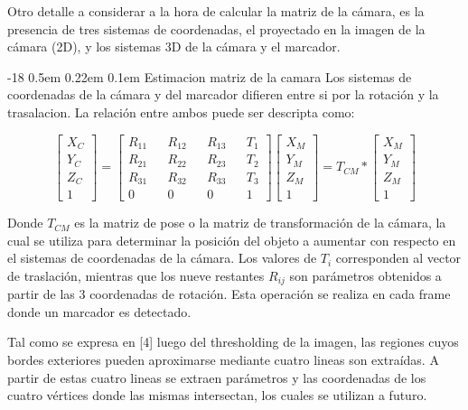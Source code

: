 \documentclass[runningheads]{llncs}
\makeatletter
\renewcommand\subsubsection{\@startsection{subsubsection}{3}{\z@}%
	{-18\p@ \@plus -4\p@ \@minus -4\p@}%
	{0.5em \@plus 0.22em \@minus 0.1em}%
	{\normalfont\normalsize\bfseries\boldmath}}
\makeatother
\begin{document}
Otro detalle a considerar a la hora de calcular la matriz de la cámara, es la presencia de tres sistemas de coordenadas, el proyectado en la imagen de la cámara (2D), y los sistemas 3D de la cámara y el marcador.
	
\subsubsection{Estimacion matriz de la camara}
Los sistemas de coordenadas de la cámara y del marcador difieren entre si por la rotación y la trasalacion. La relación entre ambos puede ser descripta como:

\[
\begin{bmatrix}
X_{C} \\
Y_{C} \\
Z_{C} \\
1
\end{bmatrix} =
\begin{bmatrix}
R_{11} && R_{12} && R_{13} && T_{1} \\
R_{21} && R_{22} && R_{23} && T_{2} \\
R_{31} && R_{32} && R_{33} && T_{3} \\
0 && 0 && 0 && 1
\end{bmatrix}
\begin{bmatrix}
X_{M} \\
Y_{M} \\
Z_{M} \\
1
\end{bmatrix} = 
T_{CM} * \begin{bmatrix}
X_{M} \\
Y_{M} \\
Z_{M} \\
1
\end{bmatrix}
\]

Donde $ T_{CM} $ es la matriz de pose o la matriz de transformación de la cámara, la cual se utiliza para determinar la posición del objeto a aumentar con respecto en el sistemas de coordenadas de la cámara. Los valores de $T_{i}$ corresponden al vector de traslación, mientras que los nueve restantes $R_{ij}$ son parámetros obtenidos a partir de las 3 coordenadas de rotación.
Esta operación se realiza en cada frame donde un marcador es detectado.

Tal como se expresa en [4] luego del thresholding de la imagen, las regiones cuyos bordes exteriores pueden aproximarse mediante cuatro lineas son extraídas. A partir de estas cuatro lineas se extraen parámetros y las coordenadas de los cuatro vértices donde las mismas intersectan, los cuales se utilizan a futuro.
\end{document}
